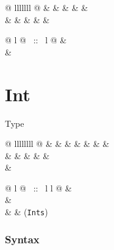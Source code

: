 \begin{isabellebody}
\begin{isamarkuptext}
\bigskip

\begin{tabular}{@ {} lllllll @ {}}
 &
 &
 &
&
&
\\
 &
 &
 &
 &
 &
\\
\end{tabular}

\begin{tabular}{@ {} l @ {~::~} l @ {}}
 & \\
 &
\end{tabular}

\section{Int}

Type 
\bigskip

\begin{tabular}{@ {} llllllll @ {}}
 &
 &
 &
 &
 &
&
&
\\
 &
 &
 &
 &
 &
\\
 &
\\
\end{tabular}

\begin{tabular}{@ {} l @ {~::~} l l @ {}}
 & \\
 & \\
\isa{{\isasymint}} &  & (\verb$Ints$)
\end{tabular}

\subsubsection*{Syntax}


\end{isamarkuptext}
\end{isabellebody}
